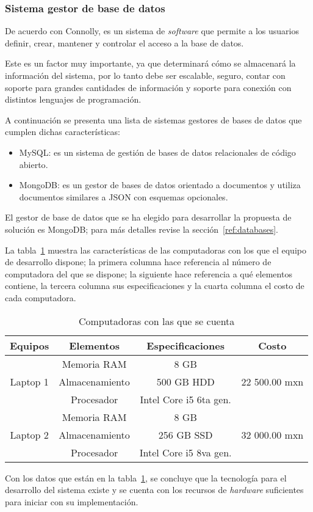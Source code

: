 \subsubsection*{Sistema gestor de base de datos}

De acuerdo con Connolly\cite{connolly_database_2005}, es un sistema de \textit{software} que permite a los usuarios definir, crear, mantener y controlar el acceso a la base de datos.


Este es un factor muy importante, ya que determinará cómo se almacenará la información del sistema, por lo tanto debe ser escalable, seguro, contar con soporte para grandes cantidades de información y soporte para conexión con distintos lenguajes de programación.


A continuación se presenta una lista de sistemas gestores de bases de datos que cumplen dichas características:

\begin{itemize}
    \item MySQL: es un sistema de gestión de bases de datos relacionales de código abierto\cite{dubois_mysql_1999}.
    \item MongoDB: es un gestor de bases de datos orientado a documentos y utiliza documentos similares a JSON con esquemas opcionales\cite{banker_mongodb_2011}.
\end{itemize}

El gestor de base de datos que se ha elegido para desarrollar la propuesta de solución es MongoDB; para más detalles revise la sección~\ref{ref:databases}.


La tabla~\ref{tab:hw_devices} muestra las características de las computadoras con los que el equipo de desarrollo dispone; la primera columna hace referencia al número de computadora del que se dispone; la siguiente hace referencia a qué elementos contiene, la tercera columna sus especificaciones y la cuarta columna el costo de cada computadora.

\begin{table}[H]
    \centering
    \begin{tabular}{|c|c|c|c|}
        \hline
        Equipos & Elementos & Especificaciones & Costo \\ \hline
        \multirow{3}{*}{Laptop 1} & Memoria RAM & 8 GB & \\
        & Almacenamiento & 500 GB HDD & 22 500.00 mxn  \\
        & Procesador & Intel Core i5 6ta gen. & \\ \hline
        \multirow{3}{*}{Laptop 2} & Memoria RAM & 8 GB & \\
        & Almacenamiento & 256 GB SSD & 32 000.00 mxn \\
        & Procesador & Intel Core i5 8va gen. & \\ \hline
    \end{tabular}
    \caption{Computadoras con las que se cuenta}
    \label{tab:hw_devices}
\end{table}


Con los datos que están en la tabla~\ref{tab:hw_devices}, se concluye que la tecnología para el desarrollo del sistema existe y se cuenta con los recursos de \textit{hardware} suficientes para iniciar con su implementación.